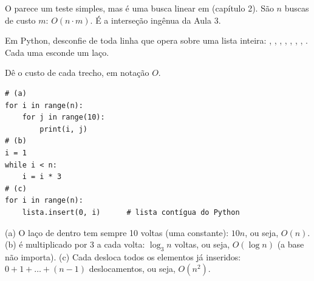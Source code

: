 O  parece um teste simples, mas é uma busca linear em 
(capítulo 2). São $n$ buscas de custo $m$: $O(n \cdot m)$. É a interseção ingênua da Aula 3.

\begin{atencao}
Em Python, desconfie de toda linha que opera sobre uma lista inteira: ,
, , , , ,
, . Cada uma esconde um laço.
\end{atencao}

\begin{exrapido}[14]
Dê o custo de cada trecho, em notação $O$.

\begin{lstlisting}
# (a)
for i in range(n):
    for j in range(10):
        print(i, j)
# (b)
i = 1
while i < n:
    i = i * 3
# (c)
for i in range(n):
    lista.insert(0, i)      # lista contígua do Python
\end{lstlisting}
\end{exrapido}

\begin{respostas}
   (a) O laço de dentro tem sempre 10 voltas (uma constante): $10n$, ou seja, $O(n)$.
  (b)  é multiplicado por 3 a cada volta: $\log_3 n$ voltas, ou seja, $O(\log n)$ (a
  base não importa). (c) Cada  desloca todos os elementos já inseridos:
  $0 + 1 + \dots + (n - 1)$ deslocamentos, ou seja, $O(n^2)$.
\end{respostas}
